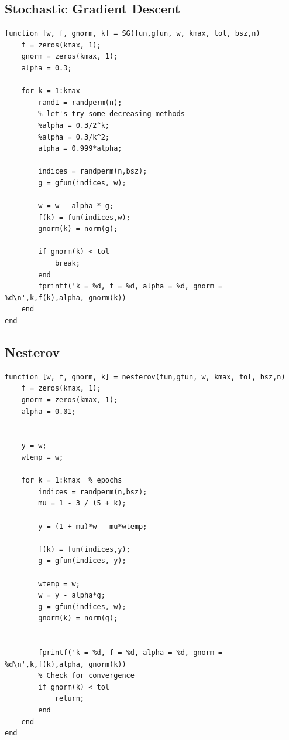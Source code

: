 \documentclass[12pt]{article}%
\begin{document}
\subsection{Stochastic Gradient Descent}\label{SGC-code}
\begin{lstlisting}[style=Matlab-editor]
function [w, f, gnorm, k] = SG(fun,gfun, w, kmax, tol, bsz,n)
    f = zeros(kmax, 1);      
    gnorm = zeros(kmax, 1); 
    alpha = 0.3;

    for k = 1:kmax  
        randI = randperm(n);
        % let's try some decreasing methods
        %alpha = 0.3/2^k;
        %alpha = 0.3/k^2;
        alpha = 0.999*alpha;
        
        indices = randperm(n,bsz);
        g = gfun(indices, w);

        w = w - alpha * g;
        f(k) = fun(indices,w);
        gnorm(k) = norm(g);
        
        if gnorm(k) < tol
            break;
        end
        fprintf('k = %d, f = %d, alpha = %d, gnorm = %d\n',k,f(k),alpha, gnorm(k))
    end
end
\end{lstlisting}

\subsection{Nesterov} \label{nesterov-code}
\begin{lstlisting}[style=Matlab-editor]
function [w, f, gnorm, k] = nesterov(fun,gfun, w, kmax, tol, bsz,n)
    f = zeros(kmax, 1);      
    gnorm = zeros(kmax, 1); 
    alpha = 0.01;
    

    y = w;
    wtemp = w;

    for k = 1:kmax  % epochs
        indices = randperm(n,bsz);
        mu = 1 - 3 / (5 + k);
            
        y = (1 + mu)*w - mu*wtemp;
        
        f(k) = fun(indices,y);
        g = gfun(indices, y);
        
        wtemp = w;
        w = y - alpha*g;
        g = gfun(indices, w);
        gnorm(k) = norm(g);


        fprintf('k = %d, f = %d, alpha = %d, gnorm = %d\n',k,f(k),alpha, gnorm(k))
        % Check for convergence
        if gnorm(k) < tol
            return;
        end
    end
end
\end{lstlisting}
\end{document}
